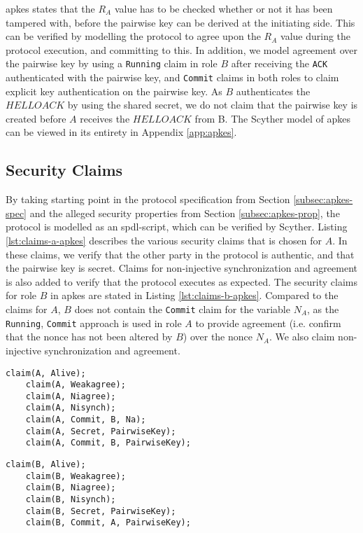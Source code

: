 \gls{apkes} states that the $R_A$ value has to be checked whether or not it has been tampered with, before the pairwise key can be derived at the initiating side. This can be verified by modelling the protocol to agree upon the $R_A$ value during the protocol execution, and committing to this. In addition, we model agreement over the pairwise key by using a \texttt{Running} claim in role $B$ after receiving the \texttt{ACK} authenticated with the pairwise key, and \texttt{Commit} claims in both roles to claim explicit key authentication on the pairwise key. As $B$ authenticates the $HELLOACK$ by using the shared secret, we do not claim that the pairwise key is created before $A$ receives the $HELLOACK$ from B. The Scyther model of \gls{apkes} can be viewed in its entirety in Appendix \ref{app:apkes}.

\subsection{Security Claims}

By taking starting point in the protocol specification from Section \ref{subsec:apkes-spec} and the alleged security properties from Section \ref{subsec:apkes-prop}, the protocol is modelled as an \gls{spdl}-script, which can be verified by Scyther. Listing \ref{lst:claims-a-apkes} describes the various security claims that is chosen for $A$. In these claims, we verify that the other party in the protocol is authentic, and that the pairwise key is secret. Claims for non-injective synchronization and agreement is also added to verify that the protocol executes as expected. The security claims for role $B$ in \gls{apkes} are stated in Listing \ref{lst:claims-b-apkes}. Compared to the claims for $A$, $B$ does not contain the \texttt{Commit} claim for the variable $N_A$, as the \texttt{Running}, \texttt{Commit} approach is used in role $A$ to provide agreement (i.e. confirm that the nonce has not been altered by $B$) over the nonce $N_A$. We also claim non-injective synchronization and agreement.\\

\begin{lstlisting}[caption={Security claims for role A in APKES.}, label={lst:claims-a-apkes}]
	claim(A, Alive);
	claim(A, Weakagree);
	claim(A, Niagree);
	claim(A, Nisynch);
	claim(A, Commit, B, Na);
	claim(A, Secret, PairwiseKey);
	claim(A, Commit, B, PairwiseKey);
\end{lstlisting}


\begin{lstlisting}[caption={Security claims for role B in APKES.}, label={lst:claims-b-apkes}]
	claim(B, Alive);
	claim(B, Weakagree);
	claim(B, Niagree);
	claim(B, Nisynch);
	claim(B, Secret, PairwiseKey);
	claim(B, Commit, A, PairwiseKey);
\end{lstlisting}


